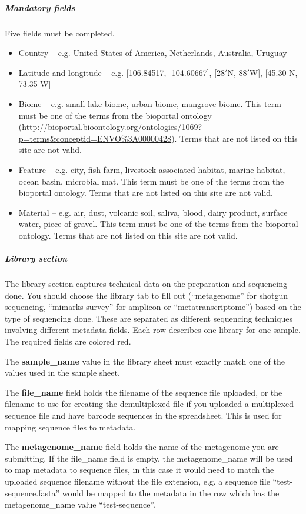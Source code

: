 \documentclass[12pt,fullpage]{report}
\begin{document}
\subparagraph*{Mandatory fields}
Five fields must be completed.
\begin{itemize}
\item Country --
e.g. United States of America, Netherlands, Australia, Uruguay
\item Latitude and longitude -- 
e.g. [106.84517, -104.60667], [28$'$N, 88$'$W], [45.30 N, 73.35 W]
\item Biome --
e.g. small lake biome, urban biome, mangrove biome. This term must be one of the terms from the bioportal ontology (\url{http://bioportal.bioontology.org/ontologies/1069?p=terms&conceptid=ENVO\%3A00000428}). Terms that are not listed on this site are not valid.
\item Feature --
e.g. city, fish farm, livestock-associated habitat, marine habitat, ocean basin, microbial mat. This term must be one of the terms from the bioportal ontology. Terms that are not listed on this site are not valid.
\item Material --
e.g. air, dust, volcanic soil, saliva, blood, dairy product, surface water, piece of gravel. This term must be one of the terms from the bioportal ontology. Terms that are not listed on this site are not valid.
\end{itemize}

\subparagraph*{Library section}
The library section captures technical data on the preparation and sequencing done. You should choose the library tab to fill out (``metagenome'' for shotgun sequencing, ``mimarks-survey'' for amplicon or ``metatranscriptome'') based on the type of sequencing done. These are separated as different sequencing techniques involving different metadata fields. Each row describes one library for one sample. The required fields are colored red.

The \textbf{sample\_name} value in the library sheet must exactly match one of the values used in the sample sheet.

The \textbf{file\_name} field holds the filename of the sequence file uploaded, or the filename to use for creating the demultiplexed file if you uploaded a multiplexed sequence file and have barcode sequences in the spreadsheet. This is used for mapping sequence files to metadata.

The \textbf{metagenome\_name} field holds the name of the metagenome you are submitting. If the file\_name field is empty, the metagenome\_name will be used to map metadata to sequence files, in this case it would need to match the uploaded sequence filename without the file extension, e.g. a sequence file ``test-sequence.fasta'' would be mapped to the metadata in the row which has the metagenome\_name value ``test-sequence''.
\end{document}
